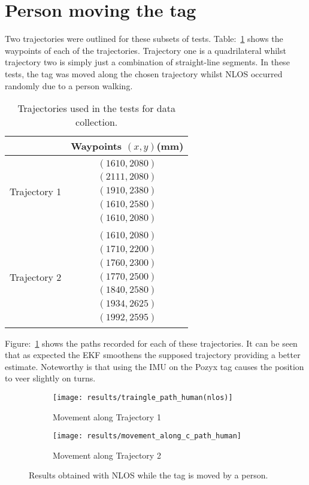 \section{Person moving the tag}\label{sec:person-moving-the-tag}
Two trajectories were outlined for these subsets of tests.
Table:~\ref{tb:trajs} shows the waypoints of each of the trajectories.
Trajectory one is a quadrilateral whilst trajectory two is simply just a combination of straight-line segments.
In these tests, the tag was moved along the chosen trajectory whilst NLOS occurred randomly due to a person walking.
\begin{table}[ht!]
    \centering
    \begin{tabular}{|c|c|}
        \hline
        & Waypoints $(x,y)$(mm)\\
        \hline
        Trajectory 1 & $\begin{array}{c}
                            (1610, 2080)\\
                            (2111, 2080)\\
                            (1910, 2380)\\
                            (1610, 2580)\\
                            (1610, 2080)
        \end{array}$\\
        \hline
        Trajectory 2 & $\begin{array}{c}
                            (1610, 2080)\\
                            (1710, 2200)\\
                            (1760, 2300)\\
                            (1770, 2500)\\
                            (1840, 2580)\\
                            (1934, 2625)\\
                            (1992, 2595)
        \end{array}$\\
        \hline
    \end{tabular}
    \caption{Trajectories used in the tests for data collection.}
    \label{tb:trajs}
\end{table}
Figure:~\ref{fig:nlos_ppl} shows the paths recorded for each of these trajectories.
It can be seen that as expected the EKF smoothens the supposed trajectory providing a better estimate.
Noteworthy is that using the IMU on the Pozyx tag causes the position to veer slightly on turns.
\begin{figure}[ht!]
    \centering
    \begin{subfigure}{0.7\textwidth}
            \texttt{[image: results/traingle\_path\_human(nlos)]}
            \caption{Movement along Trajectory 1}
    \end{subfigure}
    \begin{subfigure}{0.7\textwidth}
            \texttt{[image: results/movement\_along\_c\_path\_human]}
            \caption{Movement along Trajectory 2}
    \end{subfigure}
    \caption{Results obtained with NLOS while the tag is moved by a person.}
    \label{fig:nlos_ppl}
\end{figure}
\newpage
